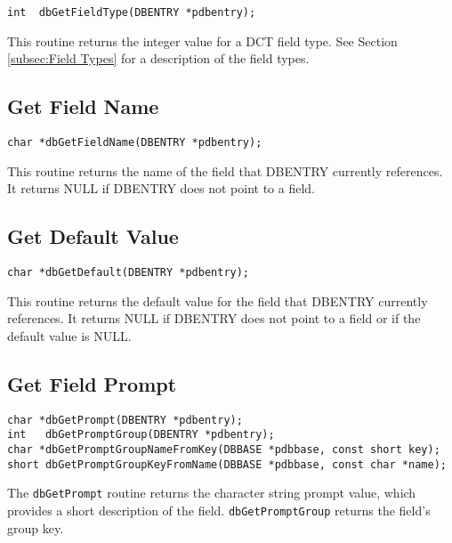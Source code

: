 \begin{verbatim}
int  dbGetFieldType(DBENTRY *pdbentry);
\end{verbatim}

This routine returns the integer value for a DCT field type.
See Section \ref{subsec:Field Types} for a description of the field types.

\subsection{Get Field Name}

\begin{verbatim}
char *dbGetFieldName(DBENTRY *pdbentry);
\end{verbatim}

This routine returns the name of the field that DBENTRY currently references. It returns NULL if DBENTRY does not 
point to a field.

\subsection{Get Default Value}

\begin{verbatim}
char *dbGetDefault(DBENTRY *pdbentry);
\end{verbatim}

This routine returns the default value for the field that DBENTRY currently references. It returns NULL if DBENTRY 
does not point to a field or if the default value is NULL.

\subsection{Get Field Prompt}
\label{subsec:Get Field Prompt}

\begin{verbatim}
char *dbGetPrompt(DBENTRY *pdbentry);
int   dbGetPromptGroup(DBENTRY *pdbentry);
char *dbGetPromptGroupNameFromKey(DBBASE *pdbbase, const short key);
short dbGetPromptGroupKeyFromName(DBBASE *pdbbase, const char *name);
\end{verbatim}

The \verb|dbGetPrompt| routine returns the character string prompt value, which provides a short description of the field.
\verb|dbGetPromptGroup| returns the field's group key.

